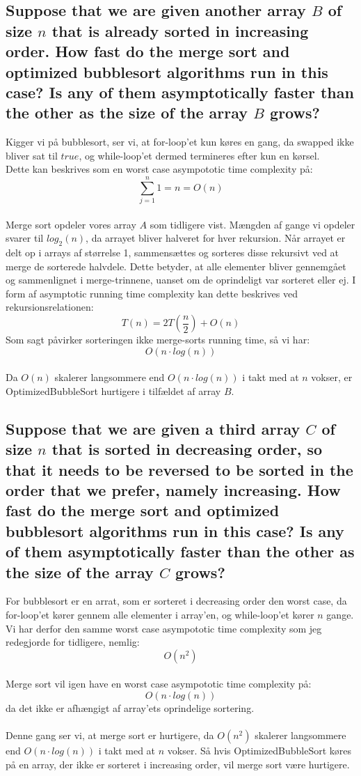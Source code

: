 \documentclass[a4paper,12pt]{article}
\begin{document}
\subsection[]{Suppose that we are given another array $B$ of size $n$ that is already sorted in increasing order. How fast do the merge sort and optimized bubblesort algorithms run in this case? Is any of them asymptotically faster than the other as the size of the array $B$ grows?}

Kigger vi på bubblesort, ser vi, at for-loop'et kun køres en gang, da swapped ikke bliver sat til $true$, og while-loop'et dermed termineres efter kun en kørsel.\\
Dette kan beskrives som en worst case asympototic time complexity på:
\[\sum_{j=1}^{n}1=n=O(n)\]
\\
Merge sort opdeler vores array $A$ som tidligere vist. Mængden af gange vi opdeler svarer til $log_2(n)$, da arrayet bliver halveret for hver rekursion. Når arrayet er delt op i arrays af størrelse 1, sammensættes og sorteres disse rekursivt ved at merge de sorterede halvdele. Dette betyder, at alle elementer bliver gennemgået og sammenlignet i merge-trinnene, uanset om de oprindeligt var sorteret eller ej. I form af asymptotic running time complexity kan dette beskrives ved rekursionsrelationen:
\[T(n) = 2T(\dfrac{n}{2}) + O(n)\]
Som sagt påvirker sorteringen ikke merge-sorts running time, så vi har:
\[O(n \cdot log(n))\]
\\
Da $O(n)$ skalerer langsommere end $O(n \cdot log(n))$ i takt med at $n$ vokser, er OptimizedBubbleSort hurtigere i tilfældet af array $B$.

\subsection[]{Suppose that we are given a third array $C$ of size $n$ that is sorted in decreasing order, so that it needs to be reversed to be sorted in the order that we prefer, namely increasing. How fast do the merge sort and optimized bubblesort algorithms run in this case? Is any of them asymptotically faster than the other as the size of the array $C$ grows?}

For bubblesort er en arrat, som er sorteret i decreasing order den worst case, da for-loop'et kører gennem alle elementer i array'en, og while-loop'et kører $n$ gange. Vi har derfor den samme worst case asympototic time complexity som jeg redegjorde for tidligere, nemlig:
\[O(n^2)\]
\\
Merge sort vil igen have en worst case asympototic time complexity på: 
\[O(n \cdot log(n))\]
da det ikke er afhængigt af array'ets oprindelige sortering.\\
\\
Denne gang ser vi, at merge sort er hurtigere, da $O(n^2)$ skalerer langsommere end $O(n \cdot log(n))$ i takt med at $n$ vokser. Så hvis OptimizedBubbleSort køres på en array, der ikke er sorteret i increasing order, vil merge sort være hurtigere.
\end{document}
